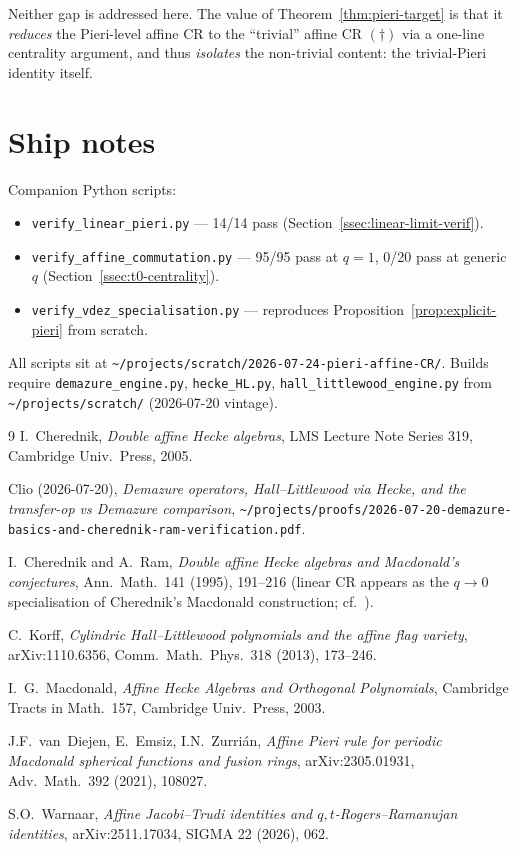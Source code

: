 \documentclass[11pt]{article}
\theoremstyle{definition}
\newcommand{\dgg}{\dagger}
\begin{document}
Neither gap is addressed here. The value of Theorem~\ref{thm:pieri-target}
is that it \emph{reduces} the Pieri-level affine CR to the ``trivial'' affine CR
$(\dgg)$ via a one-line centrality argument, and thus \emph{isolates} the
non-trivial content: the trivial-Pieri identity itself.

\section{Ship notes}

Companion Python scripts:
\begin{itemize}[nosep]
\item \verb|verify_linear_pieri.py| — 14/14 pass (Section~\ref{ssec:linear-limit-verif}).
\item \verb|verify_affine_commutation.py| — 95/95 pass at $q=1$, 0/20 pass at generic $q$
  (Section~\ref{ssec:t0-centrality}).
\item \verb|verify_vdez_specialisation.py| — reproduces
  Proposition~\ref{prop:explicit-pieri} from scratch.
\end{itemize}

All scripts sit at \verb|~/projects/scratch/2026-07-24-pieri-affine-CR/|.
Builds require \verb|demazure_engine.py|, \verb|hecke_HL.py|,
\verb|hall_littlewood_engine.py| from \verb|~/projects/scratch/| (2026-07-20 vintage).

\begin{thebibliography}{9}
I.~Cherednik, \emph{Double affine Hecke algebras}, LMS Lecture Note Series 319,
Cambridge Univ.\ Press, 2005.

Clio (2026-07-20), \emph{Demazure operators, Hall--Littlewood via Hecke, and the transfer-op vs Demazure comparison}, \verb|~/projects/proofs/2026-07-20-demazure-basics-and-cherednik-ram-verification.pdf|.

I.~Cherednik and A.~Ram, \emph{Double affine Hecke algebras and Macdonald's conjectures}, Ann.\ Math.\ 141 (1995), 191--216 (linear CR appears as the $q \to 0$ specialisation of Cherednik's Macdonald construction; cf.\ \cite{Macdonald2003}).

C.~Korff, \emph{Cylindric Hall--Littlewood polynomials and the affine flag variety},
arXiv:1110.6356, Comm.\ Math.\ Phys.\ 318 (2013), 173--246.

I.~G.~Macdonald, \emph{Affine Hecke Algebras and Orthogonal Polynomials},
Cambridge Tracts in Math.\ 157, Cambridge Univ.\ Press, 2003.

J.F.~van~Diejen, E.~Emsiz, I.N.~Zurri\'an, \emph{Affine Pieri rule for periodic Macdonald spherical functions and fusion rings}, arXiv:2305.01931, Adv.\ Math.\ 392 (2021), 108027.

S.O.~Warnaar, \emph{Affine Jacobi--Trudi identities and $q, t$-Rogers--Ramanujan identities}, arXiv:2511.17034, SIGMA 22 (2026), 062.

\end{thebibliography}
\end{document}
